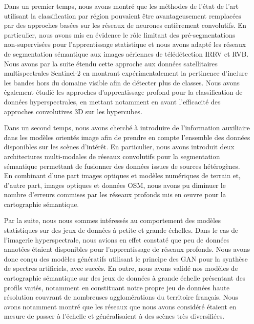 Dans un premier temps, nous avons montré que les méthodes de l'état de l'art utilisant la classification par région pouvaient être avantageusement remplacées par des approches basées sur les réseaux de neurones entièrement convolutifs. En particulier, nous avons mis en évidence le rôle limitant des pré-segmentations non-supervisées pour l'apprentissage statistique et nous avons adapté les réseaux de segmentation sémantique aux images aériennes de télédétection \gls{IRRV} et \gls{RVB}. Nous avons par la suite étendu cette approche aux données satellitaires multispectrales \gls{Sentinel}-2 en montrant expérimentalement la pertinence d'inclure les bandes hors du domaine visible afin de détecter plus de classes. Nous avons également étudié les approches d'apprentissage profond pour la classification de données hyperspectrales, en mettant notamment en avant l'efficacité des approches convolutives 3D sur les hypercubes.

Dans un second temps, nous avons cherché à introduire de l'information auxiliaire dans les modèles orientés image afin de prendre en compte l'ensemble des données disponibles sur les scènes d'intérêt. En particulier, nous avons introduit deux architectures multi-modales de réseaux convolutifs pour la segmentation sémantique permettant de fusionner des données issues de sources hétérogènes. En combinant d'une part images optiques et modèles numériques de terrain et, d'autre part, images optiques et données \glsdesc{OSM}, nous avons pu diminuer le nombre d'erreurs commises par les réseaux profonds mis en \oe{}uvre pour la cartographie sémantique.

Par la suite, nous nous sommes intéressés au comportement des modèles statistiques sur des jeux de données à petite et grande échelles. Dans le cas de l'imagerie hyperspectrale, nous avions en effet constaté que peu de données annotées étaient disponibles pour l'apprentissage de réseaux profonds. Nous avons donc conçu des modèles génératifs utilisant le principe des \gls{GAN} pour la synthèse de spectres artificiels, avec succès. En outre, nous avons validé nos modèles de cartographie sémantique sur des jeux de données à grande échelle présentant des profils variés, notamment en constituant notre propre jeu de données haute résolution couvrant de nombreuses agglomérations du territoire français. Nous avons notamment montré que les réseaux que nous avons considéré étaient en mesure de passer à l'échelle et généralisaient à des scènes très diversifiées.

